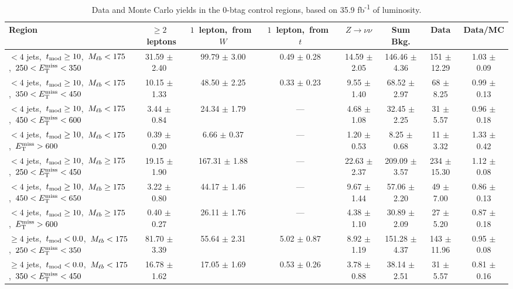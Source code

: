 \begin{table}
\centering
\scriptsize
\caption{Data and Monte Carlo yields in the 0-btag control regions,
  based on 35.9 fb\textsuperscript{-1} of luminosity.}
\label{tab:stop:1lw:cryields}
\begin{tabular}{|l|c c c c c|c|c|}
\hline
Region  & $\ge2$~leptons & $1$~lepton,~from~$W$ & $1$~lepton,~from~$t$ & $Z\rightarrow\nu\nu$ & Sum Bkg. & Data & Data/MC \\*
\hline \hline
$<4$ jets,~$t_\text{mod} \ge10$,~$M_{\ell b}<175$,~$250<E_\text{T}^\text{miss}<350$        & 31.59 $\pm$ 2.40 & 99.79 $\pm$ 3.00  & 0.49 $\pm$ 0.28 & 14.59 $\pm$ 2.05 & 146.46 $\pm$ 4.36 & 151 $\pm$ 12.29 & 1.03 $\pm$ 0.09 \\
$<4$ jets,~$t_\text{mod} \ge10$,~$M_{\ell b}<175$,~$350<E_\text{T}^\text{miss}<450$        & 10.15 $\pm$ 1.33 & 48.50 $\pm$ 2.25  & 0.33 $\pm$ 0.23 & 9.55 $\pm$ 1.40  & 68.52 $\pm$ 2.97  & 68 $\pm$ 8.25   & 0.99 $\pm$ 0.13 \\
$<4$ jets,~$t_\text{mod} \ge10$,~$M_{\ell b}<175$,~$450<E_\text{T}^\text{miss}<600$        & 3.44 $\pm$ 0.84  & 24.34 $\pm$ 1.79  &       ---       & 4.68 $\pm$ 1.08  & 32.45 $\pm$ 2.25  & 31 $\pm$ 5.57   & 0.96 $\pm$ 0.18 \\
$<4$ jets,~$t_\text{mod} \ge10$,~$M_{\ell b}<175$,~$E_\text{T}^\text{miss}>600$            & 0.39 $\pm$ 0.20  & 6.66 $\pm$ 0.37   &       ---       & 1.20 $\pm$ 0.53  & 8.25 $\pm$ 0.68   & 11 $\pm$ 3.32   & 1.33 $\pm$ 0.42 \\
\hline
$<4$ jets,~$t_\text{mod} \ge10$,~$M_{\ell b}\ge175$,~$250<E_\text{T}^\text{miss}<450$      & 19.15 $\pm$ 1.90 & 167.31 $\pm$ 1.88 &       ---       & 22.63 $\pm$ 2.37 & 209.09 $\pm$ 3.57 & 234 $\pm$ 15.30 & 1.12 $\pm$ 0.08 \\
$<4$ jets,~$t_\text{mod} \ge10$,~$M_{\ell b}\ge175$,~$450<E_\text{T}^\text{miss}<650$      & 3.22 $\pm$ 0.80  & 44.17 $\pm$ 1.46  &       ---       & 9.67 $\pm$ 1.44  & 57.06 $\pm$ 2.20  & 49 $\pm$ 7.00   & 0.86 $\pm$ 0.13 \\
$<4$ jets,~$t_\text{mod} \ge10$,~$M_{\ell b}\ge175$,~$E_\text{T}^\text{miss}>600$          & 0.40 $\pm$ 0.27  & 26.11 $\pm$ 1.76  &       ---       & 4.38 $\pm$ 1.10  & 30.89 $\pm$ 2.09  & 27 $\pm$ 5.20   & 0.87 $\pm$ 0.18 \\
\hline
$\ge4$ jets,~$t_\text{mod} <0.0$,~$M_{\ell b}<175$,~$250<E_\text{T}^\text{miss}<350$       & 81.70 $\pm$ 3.39 & 55.64 $\pm$ 2.31  & 5.02 $\pm$ 0.87 & 8.92 $\pm$ 1.19  & 151.28 $\pm$ 4.37 & 143 $\pm$ 11.96 & 0.95 $\pm$ 0.08 \\
$\ge4$ jets,~$t_\text{mod} <0.0$,~$M_{\ell b}<175$,~$350<E_\text{T}^\text{miss}<450$       & 16.78 $\pm$ 1.62 & 17.05 $\pm$ 1.69  & 0.53 $\pm$ 0.26 & 3.78 $\pm$ 0.88  & 38.14 $\pm$ 2.51  & 31 $\pm$ 5.57   & 0.81 $\pm$ 0.16 \\

\end{tabular}
\end{table}
